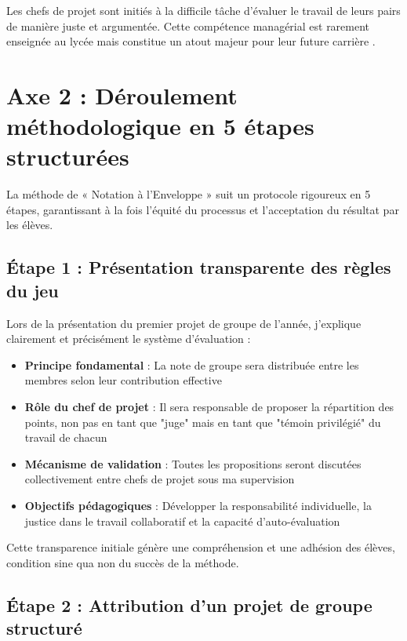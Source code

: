Les chefs de projet sont initiés à la difficile tâche d'évaluer le travail de leurs pairs de manière juste et argumentée. Cette compétence managérial est rarement enseignée au lycée mais constitue un atout majeur pour leur future carrière \parencite{knowles_andragogy}.

\section{Axe 2 : Déroulement méthodologique en 5 étapes structurées}

La méthode de « Notation à l'Enveloppe » suit un protocole rigoureux en 5 étapes, garantissant à la fois l'équité du processus et l'acceptation du résultat par les élèves.

\subsection{Étape 1 : Présentation transparente des règles du jeu}

Lors de la présentation du premier projet de groupe de l'année, j'explique clairement et précisément le système d'évaluation \parencite{evaluation_pairs_utc} :

\begin{itemize}[leftmargin=*]
    \item \textbf{Principe fondamental} : La note de groupe sera distribuée entre les membres selon leur contribution effective
    \item \textbf{Rôle du chef de projet} : Il sera responsable de proposer la répartition des points, non pas en tant que "juge" mais en tant que "témoin privilégié" du travail de chacun
    \item \textbf{Mécanisme de validation} : Toutes les propositions seront discutées collectivement entre chefs de projet sous ma supervision
    \item \textbf{Objectifs pédagogiques} : Développer la responsabilité individuelle, la justice dans le travail collaboratif et la capacité d'auto-évaluation
\end{itemize}

Cette transparence initiale génère une compréhension et une adhésion des élèves, condition sine qua non du succès de la méthode.

\subsection{Étape 2 : Attribution d'un projet de groupe structuré}

